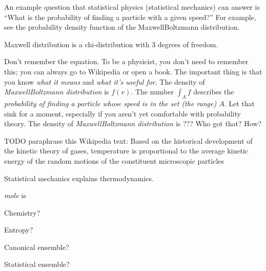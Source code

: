 An example question that statistical physics (statistical mechanics) can answer is
``What is the probability of finding a particle with a given speed?''
For example, see the probability density function of the Maxwell\textendash{}Boltzmann distribution.

Maxwell distribution is a chi-distribution with 3 degrees of freedom.

Don't remember the equation.
To be a physicist, you don't need to remember this; you can always go to Wikipedia or open a book.
The important thing is that you know \emph{what it means} and \emph{what it's useful for}.
The density of \emph{Maxwell\textendash{}Boltzmann distribution} is \(f(v)\).
The number \(\int_A f\) describes the \emph{probability of finding a particle
whose speed is in the set (the range) \(A\)}.
Let that sink for a moment, especially if you aren't yet comfortable with probability theory.
The density of \emph{Maxwell\textendash{}Boltzmann distribution} is
???
Who got that? How?

TODO paraphrase this Wikipedia text:
Based on the historical development of the kinetic theory of gases, temperature is proportional to the average kinetic energy of the random motions of the constituent microscopic particles


Statistical mechanics explains thermodynamics.


\emph{mole} is

Chemistry?

Entropy?

Canonical ensemble?

Statistical ensemble?

